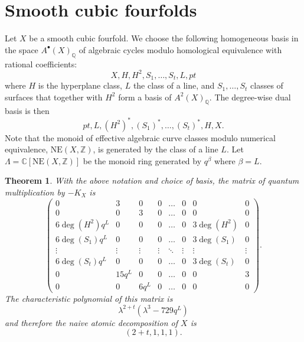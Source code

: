 \documentclass[11pt]{amsart}
\theoremstyle{plain}
\newtheorem{theorem}{Theorem}[section]
\numberwithin{equation}{section}
\theoremstyle{definition}
\theoremstyle{remark}
\newcommand{\Z}{\mathbb Z}
\newcommand{\C}{\mathbb C}
\newcommand{\Q}{\mathbb Q}
\begin{document}
\section{Smooth cubic fourfolds}\label{sCubicFourfolds}

Let $X$ be a smooth cubic fourfold. We choose the following homogeneous basis in the space $A^{\bullet}(X)_{\Q}$ of algebraic cycles modulo homological equivalence with rational coefficients: 
\[
X, H, H^2, S_1, \dots , S_t, L, pt %
\]
where $H$ is the hyperplane class, $L$ the class of a line, and $S_1, \dots , S_t$ classes of surfaces that together with $H^2$ form a basis of $A^{2}(X)_{\Q}$. The degree-wise dual basis is then
\[
pt, L, (H^2)^*, (S_1)^* , \dots , (S_t)^*, H, X . %
\]
Note that the monoid of effective algebraic curve classes modulo numerical equivalence, $\mathrm{NE}(X, \Z)$, is generated by the class of a line $L$. Let $\Lambda = \C [ \mathrm{NE}(X, \Z)]$ be the monoid ring generated by $q^{\beta}$ where $\beta = L$. 

\begin{theorem}\label{tMatrixCubic}
With the above notation and choice of basis, the matrix of quantum multiplication by $-K_X$ is 
\[
\begin{pmatrix}
0 & 3 & 0 & 0 & \dots & 0 & 0 & 0 \\
0 & 0 & 3 & 0 & \dots & 0 & 0 & 0 \\
6 \deg(H^2) q^L & 0 & 0 & 0 & \dots & 0 & 3\deg (H^2) & 0 \\
6 \deg(S_1) q^L & 0 & 0 & 0 & \dots & 0 & 3\deg (S_1) & 0 \\
\vdots & \vdots & \vdots & \vdots & \ddots & \vdots & \vdots & \vdots \\
6 \deg (S_t) q^L & 0 & 0 & 0 & \dots & 0 & 3\deg (S_t) & 0 \\
0 & 15q^L & 0 & 0 & \dots & 0 & 0 & 3 \\
0 & 0 & 6q^L & 0 & \dots & 0 & 0 & 0 
\end{pmatrix}.
\]
The characteristic polynomial of this matrix is
\[
\lambda^{2+t} (\lambda^3 - 729 q^L)
\]
and therefore the naive atomic decomposition of $X$ is
\[(2+t, 1,1,1).\]
\end{theorem}
\end{document}
